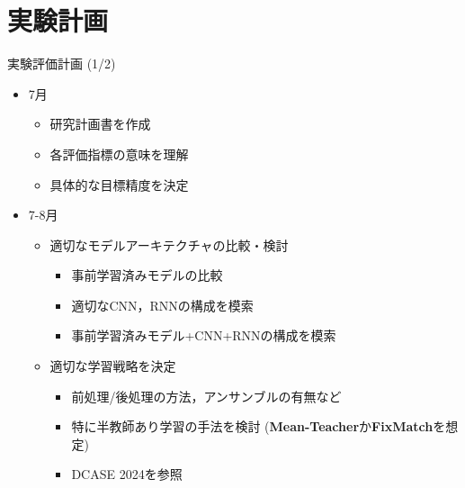 \documentclass[unicode,12pt,aspectratio=169,dvipdfmx]{beamer}
\begin{document}
\section{実験計画}
\begin{frame}{実験評価計画 (1/2)}
    \begin{itemize}
        \item 7月
        \begin{itemize}
            \item 研究計画書を作成
            \item 各評価指標の意味を理解
            \item 具体的な目標精度を決定
        \end{itemize}
        \item 7-8月
        \begin{itemize}
            \item 適切なモデルアーキテクチャの比較・検討 \cite{li2022hybrid,schmid2024multi}
            \begin{itemize}
                \item 事前学習済みモデルの比較
                \item 適切なCNN，RNNの構成を模索
                \item 事前学習済みモデル+CNN+RNNの構成を模索
            \end{itemize}
            \item 適切な学習戦略を決定
            \begin{itemize}              
                \item 前処理/後処理の方法，アンサンブルの有無など
                \item 特に半教師あり学習の手法を検討 (\textbf{Mean-Teacher}か\textbf{FixMatch}を想定)
                \item DCASE 2024を参照
            \end{itemize}
        \end{itemize}
    \end{itemize}
\end{frame}
\end{document}
